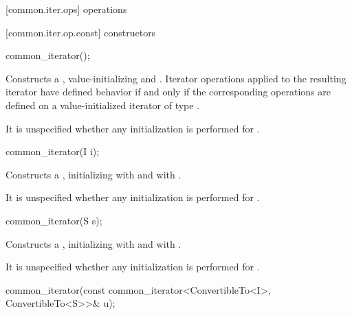 [common.iter.ops]{ operations}

[common.iter.op.const]{ constructors}

%
\begin{itemdecl}
common_iterator();
\end{itemdecl}

\begin{itemdescr}
\pnum
\effects Constructs a , value-initializing 
and . Iterator operations applied to the resulting iterator have defined
behavior if and only if the corresponding operations are defined on a
value-initialized iterator of type .

\pnum
\remarks It is unspecified whether any initialization is performed for
.
\end{itemdescr}

%
\begin{itemdecl}
common_iterator(I i);
\end{itemdecl}

\begin{itemdescr}
\pnum
\effects Constructs a , initializing
 with  and  with .

\pnum
\remarks It is unspecified whether any initialization is performed for
.
\end{itemdescr}

%
\begin{itemdecl}
common_iterator(S s);
\end{itemdecl}

\begin{itemdescr}
\pnum
\effects Constructs a , initializing
 with  and  with .

\pnum
\remarks It is unspecified whether any initialization is performed for
.
\end{itemdescr}

%
\begin{itemdecl}
common_iterator(const common_iterator<ConvertibleTo<I>, ConvertibleTo<S>>& u);
\end{itemdecl}

